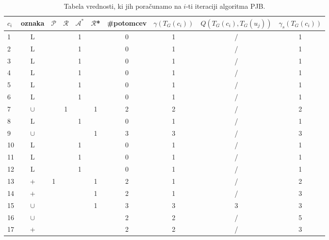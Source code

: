 \documentclass[12pt,a4paper,twoside]{article}
\theoremstyle{definition} %
\theoremstyle{plain} %
\numberwithin{equation}{section}  %
\begin{document}
\begin{table}[h!]
\begin{adjustbox}{width=\columnwidth,center}
\begin{tabular}{l|ccccccccc}
$c_i$   & oznaka  &  $\mathcal{P}$  & $\mathcal{R}$ & $\mathcal{A}^*$ &  $\mathcal{R}$* & \#potomcev & $\gamma(T_G(c_i))$ & $Q(T_G(c_i), T_G(u_j))$ & $\gamma_s(T_G(c_i))$ \\ \hline
1  & L      &      &              & 1  &    & 0          & 1       & /  & 1       \\\hline
2  & L      &      &              & 1  &    & 0          & 1       &  / & 1       \\\hline
3  & L      &      &              & 1  &    & 0          & 1       & /  & 1       \\\hline
4  & L      &      &              & 1  &    & 0          & 1       & /  & 1       \\\hline
5  & L      &      &              & 1  &    & 0          & 1       & /  & 1       \\\hline
6  & L      &      &              & 1  &    & 0          & 1       & /  & 1       \\\hline
7  & $\cup$ &      & 1            &    & 1  & 2          & 2       & /  & 2       \\\hline
8  & L      &      &              & 1  &    & 0          & 1       & /  & 1       \\\hline
9  & $\cup$ &      &              &    & 1  & 3          & 3       & /  & 3       \\\hline
10 & L      &      &              & 1  &    & 0          & 1       & /  & 1       \\\hline
11 & L      &      &              & 1  &    & 0          & 1       & /  & 1       \\\hline
12 & L      &      &              & 1  &    & 0          & 1       & /  & 1       \\\hline
13 & $+$    & 1 &              &    & 1  & 2          & 1       & /  & 2       \\\hline
14 & $+$    &      &              &    & 1  & 2          & 1       & /  & 3       \\\hline
15 & $\cup$ &      &              &    & 1  & 3          & 3       & 3 & 3       \\\hline
16 & $\cup$ &      &              &    &    & 2          & 2       & /  & 5       \\\hline
17 & $+$    &      &              &    &    & 2          & 2       & /  & 3      
\end{tabular}
\end{adjustbox}
\caption{\label{tab:tabela pradhan}Tabela vrednosti, ki jih poračunamo na $i$-ti iteraciji algoritma PJB.}
\end{table}
\end{document}
